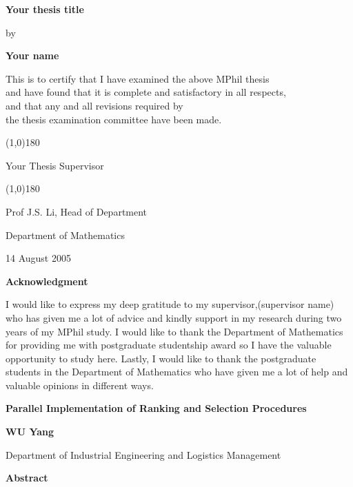 \documentclass[12pt,a4]{report}
\begin{document}
\null\vspace{1.0cm}
\begin{center}
{\Large\bf Your thesis title}
\vspace{1.5cm}

{\large by}\smallskip

{\large\bf Your name}\normalsize

\vspace{1cm}

This is to certify that I have examined the above MPhil thesis \\
and have found that it is complete and satisfactory in all respects, \\
and that any and all revisions required by \\
the thesis examination committee have been made.

\vspace{2.0cm}


\line(1,0){180} \smallskip

Your Thesis Supervisor
\vspace{1.5cm}

\line(1,0){180} \smallskip

Prof J.S. Li, Head of Department
\medskip

Department of Mathematics\medskip

14 August 2005
\end{center}

\newpage

\begin{center}{\Large\bf Acknowledgment}\normalsize
\end{center}
\vspace{0.5cm}

I would like to express my deep gratitude to my supervisor,(supervisor name) 
who has given me a lot of advice and kindly support in my research during two years of my MPhil study. 
I would like to thank the Department of Mathematics for
providing me with postgraduate studentship award so I have the valuable opportunity to study here. Lastly, I would like to thank the postgraduate students in
the Department of Mathematics who have given me a lot of help and valuable opinions in different
ways.

\newpage
{}
\tableofcontents
\listoffigures
\listoftables

\newpage
{}
\begin{center}
{\Large\bf Parallel Implementation of Ranking and Selection Procedures}
\vspace{0.5cm}

{\large \bf WU Yang}\normalsize

\medskip

Department of Industrial Engineering and Logistics Management

\end{center}
\vspace{1.5cm}
\centerline{{\bf \large Abstract}}
\vspace{1.5cm}
\end{document}
